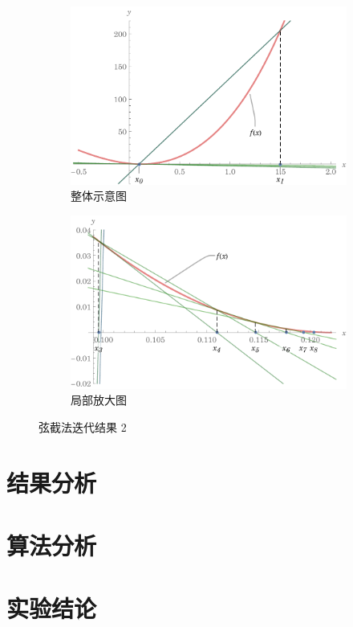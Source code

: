 \documentclass[11pt]{article}
\begin{document}
\begin{figure}
\begin{subfigure}[t]{.65\textwidth}
\begin{tabular}{|l|c|c|}
            \hline
        \end{tabular}
        \label{table:Secant2}
    \end{subfigure}
    \begin{subfigure}[t]{.33\textwidth}
        \centering
        \includegraphics[scale = 0.33]{Figure/Secant2.pdf}
        \caption{整体示意图}
        \label{figure:Secant2}
    \end{subfigure}
    \begin{subfigure}[t]{\textwidth}
        \centering
        \includegraphics[scale = 0.8]{Figure/Secant2-zoom.pdf}
        \caption{局部放大图}
        \label{figure:Secant2-zoom}
    \end{subfigure}
    \caption{弦截法迭代结果 2 }
    \label{Secant2}
\end{figure}

\section{结果分析}


\section{算法分析}


\section{实验结论}
\end{document}
